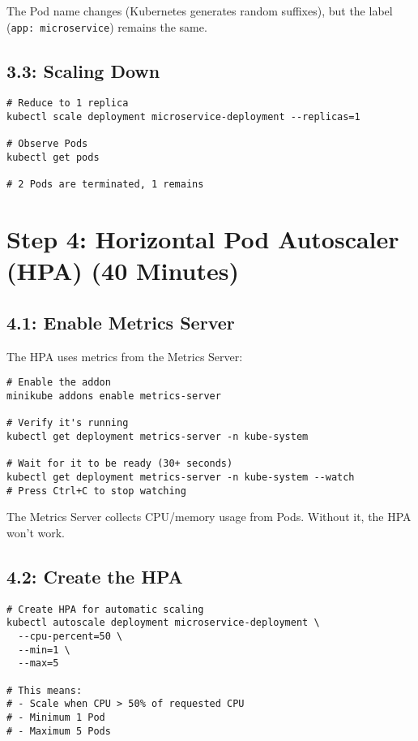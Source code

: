 \documentclass[12pt,a4paper]{article}
\begin{document}
\begin{tipbox}
The Pod name changes (Kubernetes generates random suffixes), but the label (\texttt{app: microservice}) remains the same.
\end{tipbox}

\subsection{3.3: Scaling Down}

\begin{lstlisting}[caption=Scale down]
# Reduce to 1 replica
kubectl scale deployment microservice-deployment --replicas=1

# Observe Pods
kubectl get pods

# 2 Pods are terminated, 1 remains
\end{lstlisting}

\newpage

\section{Step 4: Horizontal Pod Autoscaler (HPA) (40 Minutes)}

\subsection{4.1: Enable Metrics Server}

The HPA uses metrics from the Metrics Server:

\begin{lstlisting}[caption=Enable Metrics Server]
# Enable the addon
minikube addons enable metrics-server

# Verify it's running
kubectl get deployment metrics-server -n kube-system

# Wait for it to be ready (30+ seconds)
kubectl get deployment metrics-server -n kube-system --watch
# Press Ctrl+C to stop watching
\end{lstlisting}

\begin{importantbox}
The Metrics Server collects CPU/memory usage from Pods. Without it, the HPA won't work.
\end{importantbox}

\subsection{4.2: Create the HPA}

\begin{lstlisting}[caption=Create HPA with kubectl]
# Create HPA for automatic scaling
kubectl autoscale deployment microservice-deployment \
  --cpu-percent=50 \
  --min=1 \
  --max=5

# This means:
# - Scale when CPU > 50% of requested CPU
# - Minimum 1 Pod
# - Maximum 5 Pods
\end{lstlisting}
\end{document}
